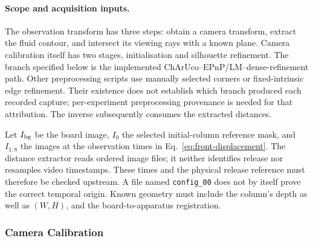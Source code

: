 \paragraph{Scope and acquisition inputs.}
The observation transform has three steps: obtain a camera transform,
extract the fluid contour, and intersect its viewing rays with a known
plane. Camera calibration itself has two stages, initialisation and
silhouette refinement. The branch specified below is the implemented
ChArUco--EPnP/LM--dense-refinement path. Other preprocessing scripts
use manually selected corners or fixed-intrinsic edge refinement.
Their existence does not establish which branch produced each recorded
capture; per-experiment preprocessing provenance is needed for that
attribution. The inverse subsequently consumes the extracted distances.

Let $I_{\rm bg}$ be the board image, $I_0$ the selected initial-column
reference mask, and $I_{1:8}$ the images at the observation times in
Eq.~\eqref{eq:front-displacement}. The distance extractor reads ordered
image files; it neither identifies release nor resamples video timestamps.
These times and the physical release reference must therefore be checked
upstream. A file named \texttt{config\_00} does not by itself prove
the correct temporal origin. Known geometry must include the column's
depth as well as $(W,H)$, and the board-to-apparatus registration.

\subsubsection{Camera Calibration}
\label{sec:camera-calibration}

